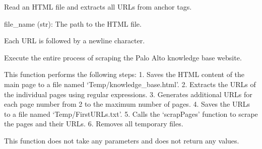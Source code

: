 \documentclass[letterpaper,10pt,english]{sphinxmanual}
\begin{document}

\begin{fulllineitems}
\label{\detokenize{Project.Script:Project.Script.RecupKbPaloAlto.get_urls_from_page_source}}
\pysigstartsignatures
{}
\pysigstopsignatures
\sphinxAtStartPar
Read an HTML file and extracts all URLs from anchor tags.
\begin{description}
\sphinxAtStartPar
file\_name (str): The path to the HTML file.

\begin{description}
\sphinxAtStartPar
Each URL is followed by a newline character.

\end{description}

\end{description}

\end{fulllineitems}


\begin{fulllineitems}
\label{\detokenize{Project.Script:Project.Script.RecupKbPaloAlto.main}}
\pysigstartsignatures
{}
\pysigstopsignatures
\sphinxAtStartPar
Execute the entire process of scraping the Palo Alto knowledge base website.

\sphinxAtStartPar
This function performs the following steps:
1. Saves the HTML content of the main page to a file named ‘Temp/knowledge\_base.html’.
2. Extracts the URLs of the individual pages using regular expressions.
3. Generates additional URLs for each page number from 2 to the maximum number of pages.
4. Saves the URLs to a file named ‘Temp/FirstURLs.txt’.
5. Calls the ‘scrapPages’ function to scrape the pages and their URLs.
6. Removes all temporary files.

\sphinxAtStartPar
This function does not take any parameters and does not return any values.

\end{fulllineitems}
\end{document}
